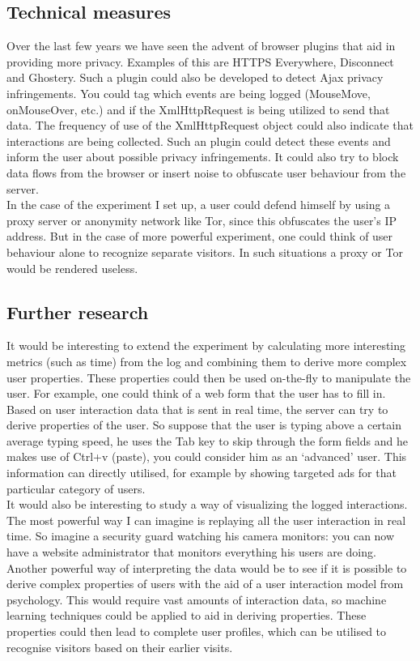 \subsection{Technical measures}
Over the last few years we have seen the advent of browser plugins that aid in providing more privacy. Examples of this are HTTPS Everywhere, Disconnect and Ghostery. Such a plugin could also be developed to detect Ajax privacy infringements. You could tag which events are being logged (MouseMove, onMouseOver, etc.) and if the XmlHttpRequest is being utilized to send that data. The frequency of use of the XmlHttpRequest object could also indicate that interactions are being collected. Such an plugin could detect these events and inform the user about possible privacy infringements. It could also try to block data flows from the browser or insert noise to obfuscate user behaviour from the server.\\

In the case of the experiment I set up, a user could defend himself by using a proxy server or anonymity network like Tor, since this obfuscates the user's IP address. But in the case of more powerful experiment, one could think of user behaviour alone to recognize separate visitors. In such situations a proxy or Tor would be rendered useless.

\subsection{Further research}
It would be interesting to extend the experiment by calculating more interesting metrics (such as time) from the log and combining them to derive more complex user properties. These properties could then be used on-the-fly to manipulate the user. For example, one could think of a web form that the user has to fill in. Based on user interaction data that is sent in real time, the server can try to derive properties of the user. So suppose that the user is typing above a certain average typing speed, he uses the Tab key to skip through the form fields and he makes use of Ctrl+v (paste), you could consider him as an `advanced' user. This information can directly utilised, for example by showing targeted ads for that particular category of users.\\

It would also be interesting to study a way of visualizing the logged interactions. The most powerful way I can imagine is replaying all the user interaction in real time. So imagine a security guard watching his camera monitors: you can now have a website administrator that monitors everything his users are doing.\\

Another powerful way of interpreting the data would be to see if it is possible to derive complex properties of users with the aid of a user interaction model from psychology. This would require vast amounts of interaction data, so machine learning techniques could be applied to aid in deriving properties. These properties could then lead to complete user profiles, which can be utilised to recognise visitors based on their earlier visits.